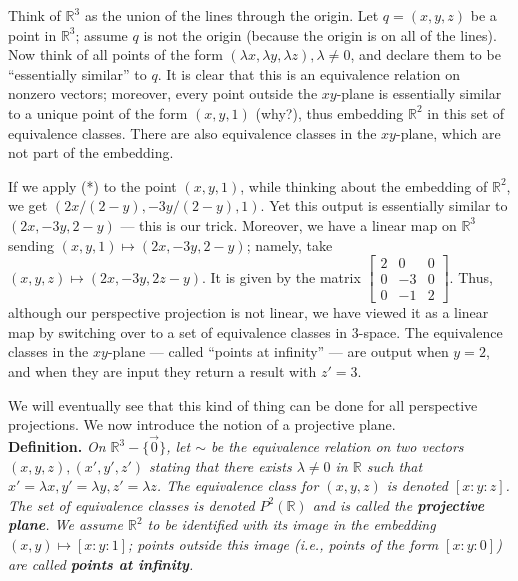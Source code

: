 \documentclass[leqno]{book}
\begin{document}
Think of $\mathbb R^3$ as the union of the lines through the origin.  Let $q=(x,y,z)$ be a point in $\mathbb R^3$; assume $q$ is not the origin (because the origin is on all of the lines).  Now think of all points of the form $(\lambda x,\lambda y,\lambda z),\lambda\ne 0$, and declare them to be ``essentially similar'' to $q$.  It is clear that this is an equivalence relation on nonzero vectors; moreover, every point outside the $xy$-plane is essentially similar to a unique point of the form $(x,y,1)$ (why?), thus embedding $\mathbb R^2$ in this set of equivalence classes.  There are also equivalence classes in the $xy$-plane, which are not part of the embedding.

If we apply (*) to the point $(x,y,1)$, while thinking about the embedding of $\mathbb R^2$, we get $(2x/(2-y),-3y/(2-y),1)$.  Yet this output is essentially similar to $(2x,-3y,2-y)$ \---- this is our trick.  Moreover, we have a linear map on $\mathbb R^3$ sending $(x,y,1)\mapsto(2x,-3y,2-y)$; namely, take $(x,y,z)\mapsto(2x,-3y,2z-y)$.  It is given by the matrix $\begin{bmatrix}2&0&0\\0&-3&0\\0&-1&2\end{bmatrix}$.  Thus, although our perspective projection is not linear, we have viewed it as a linear map by switching over to a set of equivalence classes in $3$-space.  The equivalence classes in the $xy$-plane \---- called ``points at infinity'' \---- are output when $y=2$, and when they are input they return a result with $z'=3$. %

We will eventually see that this kind of thing can be done for all perspective projections.  We now introduce the notion of a projective plane.\\

\noindent\textbf{Definition.} \emph{On $\mathbb R^3-\{\vec 0\}$, let $\sim$ be the equivalence relation on two vectors $(x,y,z),(x',y',z')$ stating that there exists $\lambda\ne 0$ in $\mathbb R$ such that $x'=\lambda x,y'=\lambda y,z'=\lambda z$.  The equivalence class for $(x,y,z)$ is denoted $[x:y:z]$.  The set of equivalence classes is denoted $P^2(\mathbb R)$ and is called the \textbf{projective plane}.  We assume $\mathbb R^2$ to be identified with its image in the embedding $(x,y)\mapsto[x:y:1]$; points outside this image (i.e., points of the form $[x:y:0]$) are called \textbf{points at infinity}.}\\
\end{document}
